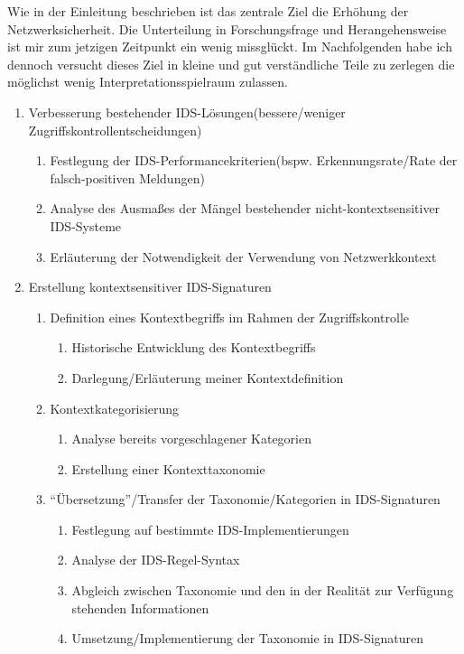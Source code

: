 \documentclass[11pt]{article} %
\begin{document}
Wie in der Einleitung beschrieben ist das zentrale Ziel die Erhöhung der Netzwerksicherheit. Die Unterteilung in Forschungsfrage und Herangehensweise ist mir zum jetzigen Zeitpunkt ein wenig missglückt.
Im Nachfolgenden habe ich dennoch versucht dieses Ziel in  kleine und gut verständliche Teile zu zerlegen die möglichst wenig Interpretationsspielraum zulassen. 
\begin{enumerate}
\item{Verbesserung bestehender IDS-Lösungen(bessere/weniger Zugriffskontrollentscheidungen)}   
\begin{enumerate}
\item{Festlegung der IDS-Performancekriterien(bspw. Erkennungsrate/Rate der falsch-positiven Meldungen)} 
\item{Analyse des Ausmaßes der Mängel bestehender nicht-kontextsensitiver IDS-Systeme}
\item{Erläuterung der Notwendigkeit der Verwendung von Netzwerkkontext}
\end{enumerate}
\item{Erstellung kontextsensitiver IDS-Signaturen} 
\begin{enumerate}
\item{Definition eines Kontextbegriffs im Rahmen der Zugriffskontrolle}
\begin{enumerate}
\item{Historische Entwicklung des Kontextbegriffs}
\item{Darlegung/Erläuterung meiner Kontextdefinition}
\end{enumerate}
\item{Kontextkategorisierung}
\begin{enumerate}
		\item{ Analyse bereits vorgeschlagener Kategorien} 
		\item{ Erstellung einer Kontexttaxonomie }
\end{enumerate}
\item{“Übersetzung”/Transfer der Taxonomie/Kategorien in IDS-Signaturen} 
\begin{enumerate}
		\item{ Festlegung auf bestimmte IDS-Implementierungen}
		\item{ Analyse der IDS-Regel-Syntax  }
		\item{ Abgleich zwischen Taxonomie und den in der Realität zur Verfügung stehenden Informationen}
		\item{ Umsetzung/Implementierung der Taxonomie in  IDS-Signaturen}
\end{enumerate}

\end{enumerate}
\end{enumerate}
\end{document}
